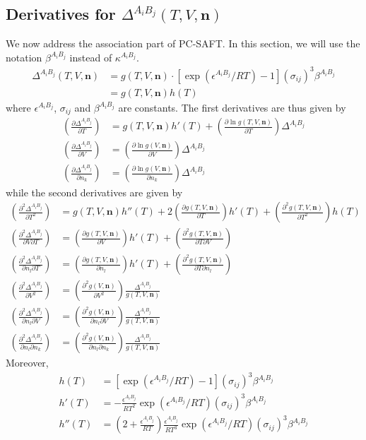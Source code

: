 \documentclass[internal,english]{sintefmemo2012}
\newcommand{\mbf}[0]{\mathbf}
\newcommand*{\pder}[2]{\left(\frac{\partial #1}{\partial #2}\right)}
\newcommand*{\pdder}[2]{\left(\frac{\partial^2 #1}{\partial #2^2}\right)}
\newcommand*{\pdcross}[3]{\left(\frac{\partial^2 #1}{\partial #2 \partial #3}\right)}
\newcommand{\lp}{\left(}
\newcommand{\rp}{\right)}
\begin{document}
\subsection{Derivatives for $\Delta^{A_i B_j}(T,V,\mbf n)$}
We now address the association part of PC-SAFT. In this section, we will use the
notation $\beta^{A_i B_j}$ instead of $\kappa^{A_i B_j}$.
\begin{align}
  \Delta^{A_i B_j}(T,V,\mbf n) &= g(T,V,\mbf n) \cdot [\exp(\epsilon^{A_i B_j}/RT) - 1] (\sigma_{ij})^3 \beta^{A_i B_j} \\ 
  &=g(T,V,\mbf n) h(T)
\end{align}
where $\epsilon^{A_i B_j}$, $\sigma_{ij}$ and $\beta^{A_i B_j}$ are
constants. The first derivatives are thus given by
\begin{align}
  \pder{\Delta^{A_i B_j}}{T}   &= g(T,V,\mbf n) h'(T) + \pder{\ln g(T,V,\mbf n)}{T} \Delta^{A_i B_j}\\
  \pder{\Delta^{A_i B_j}}{V}   &= \pder{\ln g(V,\mbf n)}{V} \Delta^{A_i B_j} \\
  \pder{\Delta^{A_i B_j}}{n_k} &= \pder{\ln g(V,\mbf n)}{n_k} \Delta^{A_i B_j}
\end{align}
while the second derivatives are given by
\begin{align}
  \pdder{\Delta^{A_i B_j}}{T}   &=  g(T,V,\mbf n) h''(T) + 2 \pder{g(T,V,\mbf n)}{T} h'(T) + \pdder{g(T,V,\mbf n)}{T} h(T) \\
  \pdcross{\Delta^{A_i B_j}}{V}{T}  &= \pder{g(T,V,\mbf n)}{V} h'(T) + \pdcross{g(T,V,\mbf n)}{T}{V} \\
  \pdcross{\Delta^{A_i B_j}}{n_l}{T}  &= \pder{g(T,V,\mbf n)}{n_l} h'(T) + \pdcross{g(T,V,\mbf n)}{T}{n_l} \\
  \pdder{\Delta^{A_i B_j}}{V}   &= \pdder{g(V,\mbf n)}{V}  \frac{\Delta^{A_i B_j}}{g(T,V,\mbf n)} \\
  \pdcross{\Delta^{A_i B_j}}{n_l}{V}  &= \pdcross{g(V,\mbf n)}{n_l}{V} \frac{\Delta^{A_i B_j}}{g(T,V,\mbf n)} \\
  \pdcross{\Delta^{A_i B_j}}{n_l}{n_k}  &= \pdcross{g(V,\mbf n)}{n_l}{n_k} \frac{\Delta^{A_i B_j}}{g(T,V,\mbf n)} 
\end{align}
Moreover,
\begin{align}
  h(T) &= [\exp(\epsilon^{A_i B_j}/RT) - 1] (\sigma_{ij})^3 \beta^{A_i B_j} \\
  h'(T) &= -\frac{\epsilon^{A_i B_j}}{RT^2} \exp(\epsilon^{A_i B_j}/RT) (\sigma_{ij})^3 \beta^{A_i B_j} \\
  h''(T) &= \lp 2 + \frac{\epsilon^{A_i B_j}}{RT} \rp \frac{\epsilon^{A_i B_j}}{RT^3} \exp(\epsilon^{A_i B_j}/RT) (\sigma_{ij})^3 \beta^{A_i B_j} 
\end{align}
\end{document}
